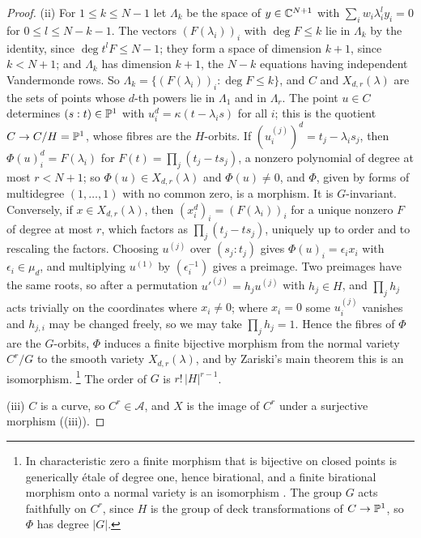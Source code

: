 \begin{proof}
(ii) For $1\le k\le N-1$ let $\Lambda_{k}$ be the space of
$y\in\mathbb{C}^{N+1}$ with $\sum_{i}w_{i}\lambda_{i}^{l}y_{i}=0$ for
$0\le l\le N-k-1$. The vectors $(F(\lambda_{i}))_{i}$ with $\deg F\le k$ lie
in $\Lambda_{k}$ by the identity, since $\deg t^{l}F\le N-1$; they form a space
of dimension $k+1$, since $k<N+1$; and $\Lambda_{k}$ has dimension $k+1$,
the $N-k$ equations having independent Vandermonde rows. So
$\Lambda_{k}=\{(F(\lambda_{i}))_{i}:\deg F\le k\}$, and $C$ and
$X_{d,r}(\lambda)$ are the sets of points whose $d$-th powers lie in
$\Lambda_{1}$ and in $\Lambda_{r}$. The point $u\in C$ determines
$(s:t)\in\mathbb{P}^{1}$ with $u_{i}^{d}=\kappa(t-\lambda_{i}s)$ for all $i$; this is
the quotient $C\to C/H=\mathbb{P}^{1}$, whose fibres are the $H$-orbits. If
$(u^{(j)}_{i})^{d}=t_{j}-\lambda_{i}s_{j}$, then
$\Phi(u)_{i}^{d}=F(\lambda_{i})$ for $F(t)=\prod_{j}(t_{j}-ts_{j})$, a nonzero
polynomial of degree at most $r<N+1$; so $\Phi(u)\in X_{d,r}(\lambda)$ and
$\Phi(u)\ne0$, and $\Phi$, given by forms of multidegree $(1,\dots,1)$ with no
common zero, is a morphism. It is $G$-invariant. Conversely, if $x\in
X_{d,r}(\lambda)$, then $(x_{i}^{d})_{i}=(F(\lambda_{i}))_{i}$ for a unique
nonzero $F$ of degree at most $r$, which factors as
$\prod_{j}(t_{j}-ts_{j})$, uniquely up to order and to rescaling the factors.
Choosing $u^{(j)}$ over $(s_{j}:t_{j})$ gives $\Phi(u)_{i}=\epsilon_{i}x_{i}$
with $\epsilon_{i}\in\mu_{d}$, and multiplying $u^{(1)}$ by
$(\epsilon_{i}^{-1})$ gives a preimage.\enlargethispage{2pt} Two preimages have the same roots, so
after a permutation $u'^{(j)}=h_{j}u^{(j)}$ with $h_{j}\in H$, and $\prod_{j}h_{j}$
acts trivially on the coordinates where $x_{i}\ne0$; where $x_{i}=0$ some
$u^{(j)}_{i}$ vanishes and $h_{j,i}$ may be changed freely, so we may take
$\prod_{j}h_{j}=1$. Hence the fibres of $\Phi$ are the $G$-orbits, $\Phi$
induces a finite bijective morphism from the normal variety $C^{r}/G$ to the
smooth variety $X_{d,r}(\lambda)$, and by Zariski's main theorem this is an
isomorphism.%
\footnote{In characteristic zero a finite morphism that is bijective on
closed points is generically \'etale of degree one, hence birational, and a
finite birational morphism onto a normal variety is an isomorphism
\cite[Chapter~III, Corollary~11.4]{Har77}. The group $G$ acts faithfully on $C^{r}$,
since $H$ is the group of deck transformations of $C\to\mathbb{P}^{1}$, so
$\Phi$ has degree $|G|$.}
The order of $G$ is $r!\,|H|^{r-1}$.

(iii) $C$ is a curve, so $C^{r}\in\mathcal{A}$, and $X$ is the image of
$C^{r}$ under a surjective morphism ((iii)).


\end{proof}
